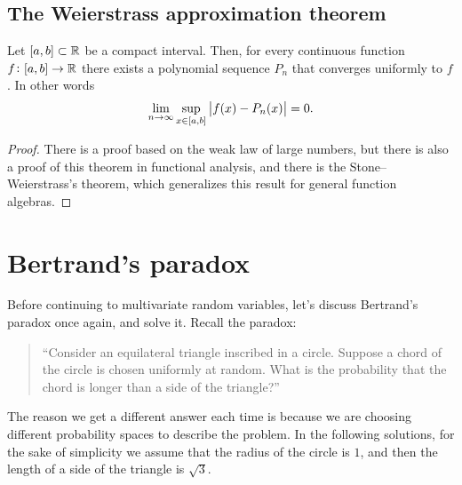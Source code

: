 \documentclass[11pt,a4paper]{article}
\begin{document}
\subsection{The Weierstrass approximation theorem}
\begin{theorem}
  Let $[a,b] \subset \mathbb{R}$ be a compact interval.
  Then, for every continuous function $f \colon [a,b] \to \mathbb{R}$
  there exists a polynomial sequence $P_n$
  that converges uniformly to $f$. In other words
  \[
    \lim_{n \to \infty}
    \sup_{x \in [a,b]}
    \left\lvert f(x) - P_n(x)\right\rvert =
    0.
  \]
\end{theorem}
\begin{proof}
  There is a proof based on the weak law of large numbers,
  but there is also a proof of this theorem in functional
  analysis, and there is the Stone--Weierstrass's theorem,
  which generalizes this result for general function algebras.
\end{proof}

\newpage

\section{Bertrand's paradox}
\label{sec:bertrand-paradox}
Before continuing to multivariate random variables, let's discuss Bertrand's
paradox once again, and solve it. Recall the paradox:
\begin{quote}
  ``Consider an equilateral triangle inscribed in a circle. 
  Suppose a chord of the circle is chosen uniformly at random. 
  What is the probability that the chord is longer than a side of the 
  triangle?''
\end{quote}
The reason we get a different answer
each time is because we are choosing different probability
spaces to describe the problem.
In the following solutions, for the sake of simplicity
we assume that the radius of the circle is $1$,
and then the length of a side of the triangle is $\sqrt{3}$.
\end{document}
